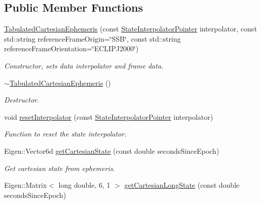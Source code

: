 \subsection*{Public Member Functions}
\begin{DoxyCompactItemize}
\item 
\hyperlink{classtudat_1_1ephemerides_1_1TabulatedCartesianEphemeris_ad8cbe3eb57a58c172c5b4be5b96ee060}{Tabulated\+Cartesian\+Ephemeris} (const \hyperlink{classtudat_1_1ephemerides_1_1TabulatedCartesianEphemeris_ac99b60b8a32901ffa73148e7d6eb557a}{State\+Interpolator\+Pointer} interpolator, const std\+::string reference\+Frame\+Origin=\char`\"{}S\+SB\char`\"{}, const std\+::string reference\+Frame\+Orientation=\char`\"{}E\+C\+L\+I\+P\+J2000\char`\"{})
\begin{DoxyCompactList}\small\item\em Constructor, sets data interpolator and frame data. \end{DoxyCompactList}\item 
\hyperlink{classtudat_1_1ephemerides_1_1TabulatedCartesianEphemeris_a73ed0893d7e82f5e23487cf9c8f56b2b}{$\sim$\+Tabulated\+Cartesian\+Ephemeris} ()
\begin{DoxyCompactList}\small\item\em Destructor. \end{DoxyCompactList}\item 
void \hyperlink{classtudat_1_1ephemerides_1_1TabulatedCartesianEphemeris_a02a693c96a1234906361545e7efae977}{reset\+Interpolator} (const \hyperlink{classtudat_1_1ephemerides_1_1TabulatedCartesianEphemeris_ac99b60b8a32901ffa73148e7d6eb557a}{State\+Interpolator\+Pointer} interpolator)
\begin{DoxyCompactList}\small\item\em Function to reset the state interpolator. \end{DoxyCompactList}\item 
Eigen\+::\+Vector6d \hyperlink{classtudat_1_1ephemerides_1_1TabulatedCartesianEphemeris_aec6aafbcce0b0fc6f4b13e4559bb96ce}{get\+Cartesian\+State} (const double seconds\+Since\+Epoch)
\begin{DoxyCompactList}\small\item\em Get cartesian state from ephemeris. \end{DoxyCompactList}\item 
Eigen\+::\+Matrix$<$ long double, 6, 1 $>$ \hyperlink{classtudat_1_1ephemerides_1_1TabulatedCartesianEphemeris_a0b73d788a6c6c33954ccec06971b3491}{get\+Cartesian\+Long\+State} (const double seconds\+Since\+Epoch)

\end{DoxyCompactItemize}
